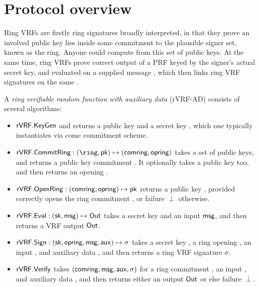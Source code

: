 \section{Protocol overview}
\label{sec:overview}

Ring VRFs are firstly ring signatures broadly interpreted, in that they
prove an involved public key lies inside some commitment \comring to
the plausible signer set, known as the ring.
Anyone could compute \comring from this set of public keys.
%
At the same time, ring VRFs prove correct output of a PRF keyed by
the signer's actual secret key, and evaluated on a supplied message \msg,
which then links ring VRF signatures on the same \msg.

\begin{definition}
A {\em ring verifiable random function with auxiliary data} (rVRF-AD)
consists of several algorithms:
\begin{itemize}
	\item ${\mathsf{rVRF}}.{\mathsf{KeyGen}}$ and returns a public key \pk and a secret key \sk, which one typically instantiates via come commitment scheme. 
	\item $\rVRF.\CommitRing : (\ring,\pk) \mapsto (\comring,\openring)$ takes a set \ring of public keys, and returns a public key commitment \comring.  It optionally takes a public key \pk too, and then returns an opening \openring.
	\item ${\mathsf{rVRF}}.{\mathsf{OpenRing}} : (\mathsf{comring},\mathsf{opring}) \mapsto \mathsf{pk}$ returns a public key \pk, provided \openring correctly opens the ring commitment \comring, or failure $\perp$ otherwise.
	\item ${\mathsf{rVRF}}.{\mathsf{Eval}} : (\mathsf{sk},\mathsf{msg}) \mapsto {\ensuremath{\mathsf{Out}}}$  takes a secret key \sk and an input $\mathsf{msg}$, and then returns a VRF output ${\mathsf{Out}}$.
	\item ${\mathsf{rVRF}}.{\mathsf{Sign}} : (\mathsf{sk},\mathsf{opring},\mathsf{msg},\mathsf{aux}) \mapsto \sigma$ takes a secret key \sk, a ring opening \openring, an input \msg, and auxiliary data \aux, and then returns a ring VRF signature $\sigma$.
	\item ${\mathsf{rVRF}}.{\mathsf{Verify}}$ takes $(\mathsf{comring},\mathsf{msg},\mathsf{aux},\sigma)$ for a ring commitment \comring, an input \msg, and auxiliary data \aux, and then returns either an output ${\mathsf{Out}}$ or else failure $\perp$.
\end{itemize}
\end{definition}

